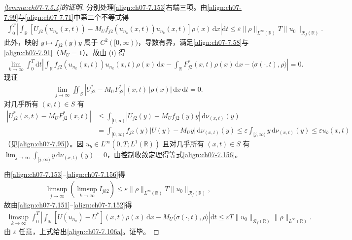 \documentclass[../../main.tex]{subfiles}%
\begin{document}
\begin{proof}[\cref{lemma:ch07-7.5.4}的证明]
分别处理\eqref{align:ch07-7.153}右端三项。由\eqref{align:ch07-7.99}与\eqref{align:ch07-7.71}中第二个不等式得
\begin{align}
\int_0^T\left|\int_{\mathbb{R}}[U_{j2}(u_{n_k}(x,t))-M_U f_{j2}(u_{n_k}(x,t))u_{n_k}(x,t)]\rho(x)\,\mathrm{d}x\right|\mathrm{d}t
\leqslant\varepsilon\|\rho\|_{L^\infty(\mathbb{R})}T\|u_0\|_{\mathscr{R}_f(\mathbb{R})}. \label{align:ch07-7.154}
\end{align}
此外，映射 $y\mapsto f_{j2}(y)y$ 属于 $C^2([0,\infty))$，导数有界，满足\eqref{align:ch07-7.58}与\eqref{align:ch07-7.91}（$M_U=1$）。故由 (i) 得
\begin{align}
\lim_{k\to\infty}\int_0^T\mathrm{d}t\left|\int_{\mathbb{R}}f_{j2}(u_{n_k}(x,t))u_{n_k}(x,t)\rho(x)\,\mathrm{d}x-\int_{\mathbb{R}}F_{j2}^*(x,t)\rho(x)\,\mathrm{d}x-\langle\sigma(\cdot,t),\rho\rangle\right|=0. \label{align:ch07-7.155}
\end{align}
现证
\begin{align}
\lim_{j\to\infty}\iint_S|U_{j2}^*-M_U F_{j2}^*|(x,t)\,|\rho(x)|\,\mathrm{d}x\,\mathrm{d}t=0. \label{align:ch07-7.156}
\end{align}
对几乎所有 $(x,t)\in S$ 有
\begin{align*}
|U_{j2}^*(x,t)-M_U F_{j2}^*(x,t)|
&\leqslant\int_{[0,\infty)}|U_{j2}(y)-M_U f_{j2}(y)y|\,\mathrm{d}\nu_{(x,t)}(y)\\
&=\int_{[0,\infty)}f_{j2}(y)|U(y)-M_U y|\,\mathrm{d}\nu_{(x,t)}(y)
\leqslant\varepsilon\int_{[j,\infty)}y\,\mathrm{d}\nu_{(x,t)}(y)\leqslant\varepsilon u_b(x,t)
\end{align*}
（见\eqref{align:ch07-7.95}）。因 $u_b\in L^\infty(0,T;L^1(\mathbb{R}))$ 且对几乎所有 $(x,t)\in S$ 有 $\lim_{j\to\infty}\int_{[j,\infty)}y\,\mathrm{d}\nu_{(x,t)}(y)=0$，由控制收敛定理得等式\eqref{align:ch07-7.156}。

由\eqref{align:ch07-7.153}--\eqref{align:ch07-7.156}得
\begin{align*}
\limsup_{j\to\infty}\left(\limsup_{k\to\infty}I_{jk2}\right)\leqslant\varepsilon\|\rho\|_{L^\infty(\mathbb{R})}T\|u_0\|_{\mathscr{R}_f(\mathbb{R})},
\end{align*}
故由\eqref{align:ch07-7.151}--\eqref{align:ch07-7.152}得
\begin{align*}
\limsup_{k\to\infty}\int_0^T\left|\int_{\mathbb{R}}[U(u_{n_k})-U^*](x,t)\rho(x)\,\mathrm{d}x-M_U\langle\sigma(\cdot,t),\rho\rangle\right|\mathrm{d}t
\leqslant\varepsilon T\|u_0\|_{\mathscr{R}_f(\mathbb{R})}\|\rho\|_{L^\infty(\mathbb{R})}.
\end{align*}
由 $\varepsilon$ 任意，上式给出\eqref{align:ch07-7.106a}。证毕。
\end{proof}
\end{document}
